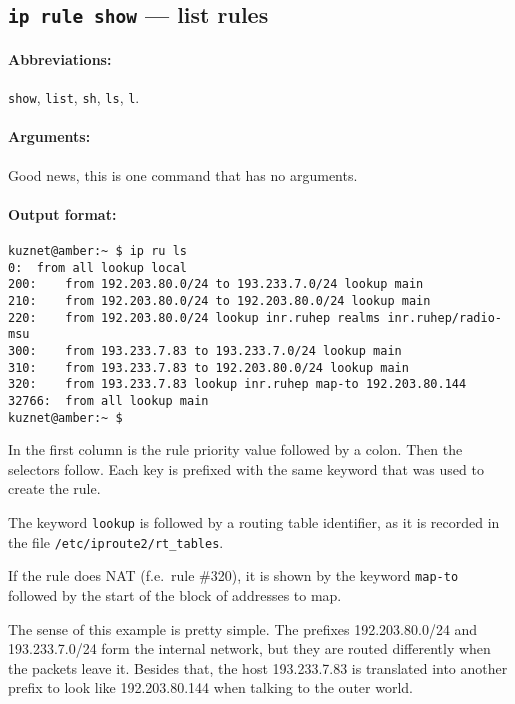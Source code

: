 \subsection{{\tt ip rule show} --- list rules}
\label{IP-RULE-SHOW}

\paragraph{Abbreviations:} \verb|show|, \verb|list|, \verb|sh|, \verb|ls|, \verb|l|.


\paragraph{Arguments:} Good news, this is one command that has no arguments.

\paragraph{Output format:}

\begin{verbatim}
kuznet@amber:~ $ ip ru ls
0:	from all lookup local 
200:	from 192.203.80.0/24 to 193.233.7.0/24 lookup main
210:	from 192.203.80.0/24 to 192.203.80.0/24 lookup main
220:	from 192.203.80.0/24 lookup inr.ruhep realms inr.ruhep/radio-msu
300:	from 193.233.7.83 to 193.233.7.0/24 lookup main
310:	from 193.233.7.83 to 192.203.80.0/24 lookup main
320:	from 193.233.7.83 lookup inr.ruhep map-to 192.203.80.144
32766:	from all lookup main 
kuznet@amber:~ $
\end{verbatim}

In the first column is the rule priority value followed
by a colon. Then the selectors follow. Each key is prefixed
with the same keyword that was used to create the rule.

The keyword \verb|lookup| is followed by a routing table identifier,
as it is recorded in the file \verb|/etc/iproute2/rt_tables|.

If the rule does NAT (f.e.\ rule \#320), it is shown by the keyword
\verb|map-to| followed by the start of the block of addresses to map.

The sense of this example is pretty simple. The prefixes
192.203.80.0/24 and 193.233.7.0/24 form the internal network, but
they are routed differently when the packets leave it.
Besides that, the host 193.233.7.83 is translated into
another prefix to look like 192.203.80.144 when talking
to the outer world.



